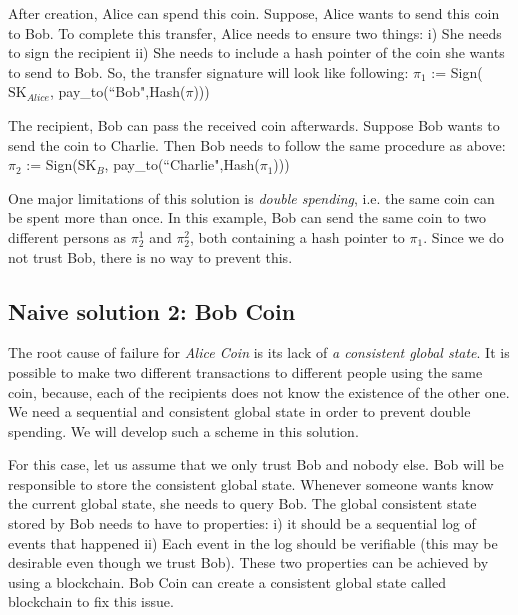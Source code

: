 \documentclass[twoside]{article}
\begin{document}
	After creation, Alice can spend this coin. Suppose, Alice wants to send this coin to Bob. To complete this transfer, Alice needs to ensure two things: 
	i) She needs to sign the recipient ii) She needs to include a hash pointer of the coin she wants to send to Bob.
	So, the transfer signature will look like following: 
	$\pi_{1}$ := Sign($\text{SK}_{Alice}$, pay\_to(``Bob",Hash($\pi$))) 
	
	The recipient, Bob can pass the received coin afterwards. Suppose Bob wants to send the coin to Charlie. Then Bob needs to follow the same procedure as above:
	$\pi_{2}$ := Sign($\text{SK}_{B}$, pay\_to(``Charlie",Hash($\pi_1$))) 
	
	One major limitations of this solution is \textit{double spending}, i.e. the same coin can be spent more than once.
	In this example, Bob can send the same coin to two different persons as {$\pi_{2}^1$} and {$\pi_{2}^2$}, both containing a hash pointer to {$\pi_{1}$}. Since we do not trust Bob,
	there is no way to prevent this.
	
	\subsection{Naive solution 2: Bob Coin}
	The root cause of failure for \textit{Alice Coin} is its lack of \textit{a consistent global state}. It is possible to make two different transactions to different people using the same coin, 
	because, each of the recipients does not know the existence of the other one. We need a sequential and consistent global state in order to prevent double spending. We will
	develop such a scheme in this solution.
	
	For this case, let us assume that we only trust Bob and nobody else. Bob will be responsible to store the consistent global state. Whenever someone wants know the current global state, 
	she needs to query Bob. The global consistent state stored by Bob needs to have to properties: i) it should be a sequential log of events that happened ii) Each event in the log should be verifiable
	(this may be desirable even though we trust Bob). These two properties can be achieved by using a blockchain.
	Bob Coin can create a consistent global state called blockchain to fix this issue. 
	
\end{document}
